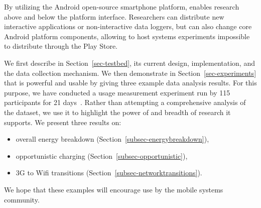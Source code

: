 By utilizing the Android open-source smartphone platform, \PhoneLab{} enables
research above and below the platform interface. Researchers can distribute
new interactive applications or non-interactive data loggers, but can also
change core Android platform components, allowing \PhoneLab{} to host systems
experiments impossible to distribute through the Play Store.

We first describe \PhoneLab{} in Section~\ref{sec-testbed}, its current design,
implementation, and the data collection mechanism. We then demonstrate in
Section~\ref{sec-experiments} that \PhoneLab{} is powerful and usable by giving
three example data analysis results. For this purpose, we have conducted a usage
measurement experiment run by 115 \PhoneLab{} participants for 21
days~. Rather than attempting a comprehensive analysis of
the dataset, we use it to highlight the power of \PhoneLab{} and breadth of
research it supports. We present three results on:

\begin{itemize}
\item overall energy breakdown (Section~\ref{subsec-energybreakdown}),
\item opportunistic charging (Section~\ref{subsec-opportunistic}),
\item 3G to Wifi transitions (Section~\ref{subsec-networktransitions}).
\vspace{0.05in}
\end{itemize}

We hope that these examples will encourage \PhoneLab{} use by the mobile systems
community.
